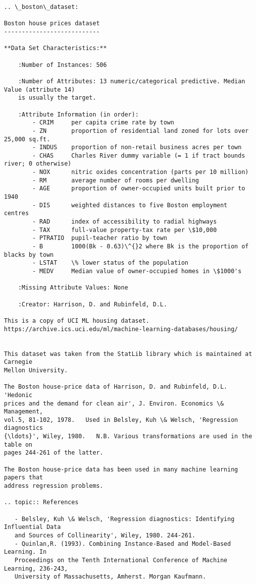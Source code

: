 \documentclass[11pt]{article}
\begin{document}
    \begin{Verbatim}[commandchars=\\\{\}]
.. \_boston\_dataset:

Boston house prices dataset
---------------------------

**Data Set Characteristics:**  

    :Number of Instances: 506 

    :Number of Attributes: 13 numeric/categorical predictive. Median Value (attribute 14) 
    is usually the target.

    :Attribute Information (in order):
        - CRIM     per capita crime rate by town
        - ZN       proportion of residential land zoned for lots over 25,000 sq.ft.
        - INDUS    proportion of non-retail business acres per town
        - CHAS     Charles River dummy variable (= 1 if tract bounds river; 0 otherwise)
        - NOX      nitric oxides concentration (parts per 10 million)
        - RM       average number of rooms per dwelling
        - AGE      proportion of owner-occupied units built prior to 1940
        - DIS      weighted distances to five Boston employment centres
        - RAD      index of accessibility to radial highways
        - TAX      full-value property-tax rate per \$10,000
        - PTRATIO  pupil-teacher ratio by town
        - B        1000(Bk - 0.63)\^{}2 where Bk is the proportion of blacks by town
        - LSTAT    \% lower status of the population
        - MEDV     Median value of owner-occupied homes in \$1000's

    :Missing Attribute Values: None

    :Creator: Harrison, D. and Rubinfeld, D.L.

This is a copy of UCI ML housing dataset.
https://archive.ics.uci.edu/ml/machine-learning-databases/housing/


This dataset was taken from the StatLib library which is maintained at Carnegie 
Mellon University.

The Boston house-price data of Harrison, D. and Rubinfeld, D.L. 'Hedonic
prices and the demand for clean air', J. Environ. Economics \& Management,
vol.5, 81-102, 1978.   Used in Belsley, Kuh \& Welsch, 'Regression diagnostics
{\ldots}', Wiley, 1980.   N.B. Various transformations are used in the table on
pages 244-261 of the latter.

The Boston house-price data has been used in many machine learning papers that 
address regression problems.   
     
.. topic:: References

   - Belsley, Kuh \& Welsch, 'Regression diagnostics: Identifying Influential Data 
   and Sources of Collinearity', Wiley, 1980. 244-261.
   - Quinlan,R. (1993). Combining Instance-Based and Model-Based Learning. In 
   Proceedings on the Tenth International Conference of Machine Learning, 236-243,
   University of Massachusetts, Amherst. Morgan Kaufmann.


    \end{Verbatim}
\end{document}
